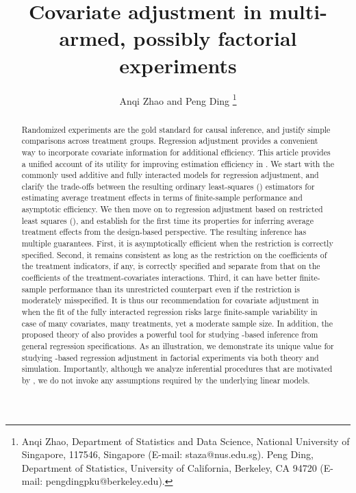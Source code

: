 \documentclass[11pt]{article}
\theoremstyle{definition}
\begin{document}
\onehalfspacing




\title{\bf  
 Covariate adjustment in multi-armed, possibly factorial experiments
} 
\author{Anqi Zhao and Peng Ding
\footnote{Anqi Zhao, Department of Statistics and Data Science, National University of Singapore, 117546, Singapore (E-mail: staza@nus.edu.sg). Peng Ding, Department of Statistics, University of California, Berkeley, CA 94720 (E-mail: pengdingpku@berkeley.edu).
}
}
\date{}
 
\maketitle

\begin{abstract}
Randomized experiments are the gold standard for causal inference, and justify simple comparisons across treatment groups. 
Regression adjustment provides a convenient way to incorporate covariate information for additional efficiency. 
This article provides a unified account of its utility for improving estimation efficiency in \mes. 
We start with the commonly used additive and fully interacted models for regression adjustment, and clarify the trade-offs between the resulting ordinary least-squares (\ols) estimators for estimating average treatment effects in terms of  finite-sample performance and asymptotic efficiency. 
We then move on to regression adjustment based on restricted least squares (\rls), and establish for the first time its properties for inferring average treatment effects from the design-based perspective. 
The resulting inference has multiple guarantees. First, it is asymptotically efficient when the restriction is correctly specified. Second, it remains consistent as long as the restriction on the coefficients of the treatment indicators, if any, is correctly specified and separate from that on the coefficients of the treatment-covariates interactions. Third, it can have better finite-sample performance than its unrestricted counterpart even if the restriction is moderately misspecified.  It is thus our recommendation for covariate adjustment in \mess when the \olss fit of the fully interacted regression risks large finite-sample variability in case of many covariates, many treatments, yet a  moderate sample size. 
In addition, the proposed theory of \rlss also provides a powerful tool for studying \ols-based inference from general regression specifications. 
As an illustration, we demonstrate its unique value for studying \ols-based regression adjustment in factorial experiments via both theory and simulation. 
Importantly, although we analyze inferential procedures that are motivated by \ols, we do not invoke any assumptions required by the underlying linear models.
\end{abstract}
 
\end{document}
